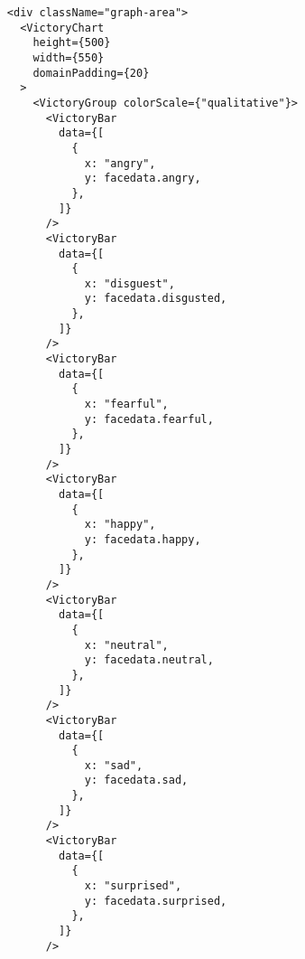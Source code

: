 \begin{verbatim}
                        <div className="graph-area">
                          <VictoryChart
                            height={500}
                            width={550}
                            domainPadding={20}
                          >
                            <VictoryGroup colorScale={"qualitative"}>
                              <VictoryBar
                                data={[
                                  {
                                    x: "angry",
                                    y: facedata.angry,
                                  },
                                ]}
                              />
                              <VictoryBar
                                data={[
                                  {
                                    x: "disguest",
                                    y: facedata.disgusted,
                                  },
                                ]}
                              />
                              <VictoryBar
                                data={[
                                  {
                                    x: "fearful",
                                    y: facedata.fearful,
                                  },
                                ]}
                              />
                              <VictoryBar
                                data={[
                                  {
                                    x: "happy",
                                    y: facedata.happy,
                                  },
                                ]}
                              />
                              <VictoryBar
                                data={[
                                  {
                                    x: "neutral",
                                    y: facedata.neutral,
                                  },
                                ]}
                              />
                              <VictoryBar
                                data={[
                                  {
                                    x: "sad",
                                    y: facedata.sad,
                                  },
                                ]}
                              />
                              <VictoryBar
                                data={[
                                  {
                                    x: "surprised",
                                    y: facedata.surprised,
                                  },
                                ]}
                              />

\end{verbatim}
